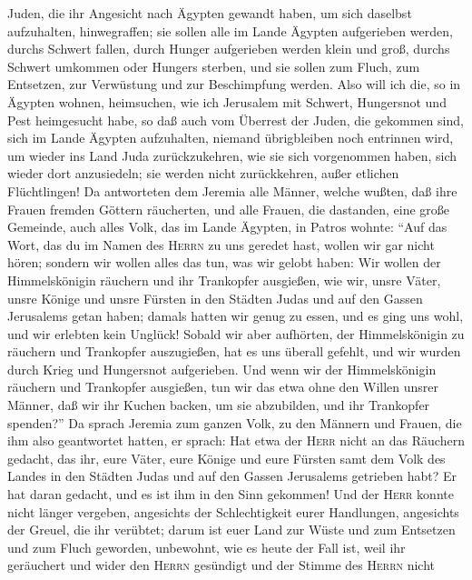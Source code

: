 Juden, die ihr Angesicht nach Ägypten gewandt haben, um sich daselbst
aufzuhalten, hinwegraffen; sie sollen alle im Lande Ägypten aufgerieben
werden, durchs Schwert fallen, durch Hunger aufgerieben werden klein und
groß, durchs Schwert umkommen oder Hungers sterben, und sie sollen zum
Fluch, zum Entsetzen, zur Verwüstung und zur Beschimpfung werden.
 Also will ich die, so in Ägypten wohnen, heimsuchen, wie
ich Jerusalem mit Schwert, Hungersnot und Pest heimgesucht habe,
 so daß auch vom Überrest der Juden, die gekommen sind,
sich im Lande Ägypten aufzuhalten, niemand übrigbleiben noch entrinnen
wird, um wieder ins Land Juda zurückzukehren, wie sie sich vorgenommen
haben, sich wieder dort anzusiedeln; sie werden nicht zurückkehren,
außer etlichen Flüchtlingen!  Da antworteten dem Jeremia
alle Männer, welche wußten, daß ihre Frauen fremden Göttern räucherten,
und alle Frauen, die dastanden, eine große Gemeinde, auch alles Volk,
das im Lande Ägypten, in Patros wohnte:  ``Auf das Wort,
das du im Namen des \textsc{Herrn} zu uns geredet hast, wollen wir gar
nicht hören;  sondern wir wollen alles das tun, was wir
gelobt haben: Wir wollen der Himmelskönigin räuchern und ihr Trankopfer
ausgießen, wie wir, unsre Väter, unsre Könige und unsre Fürsten in den
Städten Judas und auf den Gassen Jerusalems getan haben; damals hatten
wir genug zu essen, und es ging uns wohl, und wir erlebten kein Unglück!
 Sobald wir aber aufhörten, der Himmelskönigin zu
räuchern und Trankopfer auszugießen, hat es uns überall gefehlt, und wir
wurden durch Krieg und Hungersnot aufgerieben.  Und wenn
wir der Himmelskönigin räuchern und Trankopfer ausgießen, tun wir das
etwa ohne den Willen unsrer Männer, daß wir ihr Kuchen backen, um sie
abzubilden, und ihr Trankopfer spenden?''  Da sprach
Jeremia zum ganzen Volk, zu den Männern und Frauen, die ihm also
geantwortet hatten, er sprach:  Hat etwa der
\textsc{Herr} nicht an das Räuchern gedacht, das ihr, eure Väter, eure
Könige und eure Fürsten samt dem Volk des Landes in den Städten Judas
und auf den Gassen Jerusalems getrieben habt? Er hat daran gedacht, und
es ist ihm in den Sinn gekommen!  Und der \textsc{Herr}
konnte nicht länger vergeben, angesichts der Schlechtigkeit eurer
Handlungen, angesichts der Greuel, die ihr verübtet; darum ist euer Land
zur Wüste und zum Entsetzen und zum Fluch geworden, unbewohnt, wie es
heute der Fall ist,  weil ihr geräuchert und wider den
\textsc{Herrn} gesündigt und der Stimme des \textsc{Herrn} nicht
